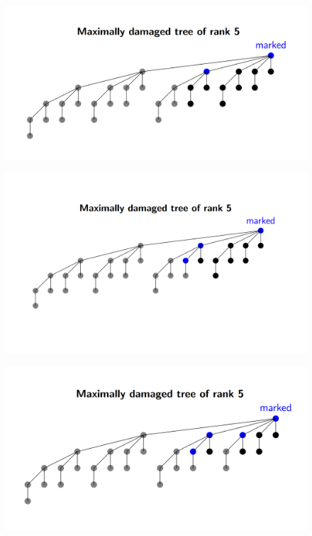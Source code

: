 \documentclass[14pt,a4paper]{report}
\begin{document}
\begin{figure}[H]
    \includegraphics[scale=.3,bb=0 0 404 401]{3.png}
    \caption{}
    \label{fig:three}
\end{figure}
\begin{figure}[H]
    \includegraphics[scale=.3,bb=0 0 404 401]{4.png}
    \caption{}
    \label{fig:four}
\end{figure}
\begin{figure}[H]
    \includegraphics[scale=.3,bb=0 0 404 401]{5.png}
    \caption{}
    \label{fig:five}
\end{figure}
\end{document}
